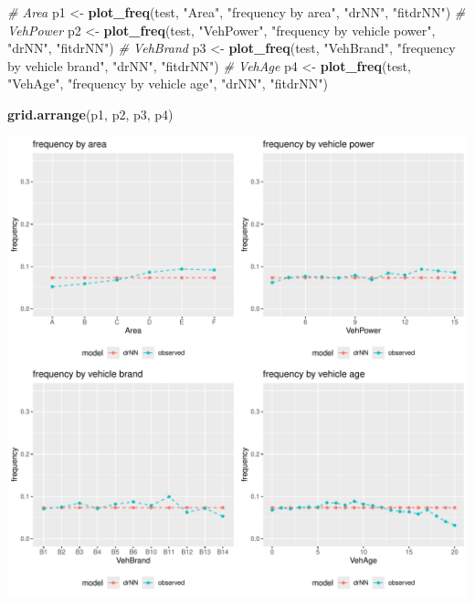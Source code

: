 \documentclass[
]{article}
\newenvironment{Shaded}{\begin{snugshade}}{\end{snugshade}}
\newcommand{\CommentTok}[1]{\textcolor[rgb]{0.56,0.35,0.01}{\textit{#1}}}
\newcommand{\FunctionTok}[1]{\textcolor[rgb]{0.13,0.29,0.53}{\textbf{#1}}}
\newcommand{\NormalTok}[1]{#1}
\newcommand{\OtherTok}[1]{\textcolor[rgb]{0.56,0.35,0.01}{#1}}
\newcommand{\StringTok}[1]{\textcolor[rgb]{0.31,0.60,0.02}{#1}}
\begin{document}
\begin{Shaded}
\begin{Highlighting}[]
\CommentTok{\# Area}
\NormalTok{p1 }\OtherTok{\textless{}{-}} \FunctionTok{plot\_freq}\NormalTok{(test, }\StringTok{"Area"}\NormalTok{, }\StringTok{"frequency by area"}\NormalTok{, }\StringTok{"drNN"}\NormalTok{, }\StringTok{"fitdrNN"}\NormalTok{)}
\CommentTok{\# VehPower}
\NormalTok{p2 }\OtherTok{\textless{}{-}} \FunctionTok{plot\_freq}\NormalTok{(test, }\StringTok{"VehPower"}\NormalTok{, }\StringTok{"frequency by vehicle power"}\NormalTok{, }\StringTok{"drNN"}\NormalTok{, }\StringTok{"fitdrNN"}\NormalTok{)}
\CommentTok{\# VehBrand}
\NormalTok{p3 }\OtherTok{\textless{}{-}} \FunctionTok{plot\_freq}\NormalTok{(test, }\StringTok{"VehBrand"}\NormalTok{, }\StringTok{"frequency by vehicle brand"}\NormalTok{, }\StringTok{"drNN"}\NormalTok{, }\StringTok{"fitdrNN"}\NormalTok{)}
\CommentTok{\# VehAge}
\NormalTok{p4 }\OtherTok{\textless{}{-}} \FunctionTok{plot\_freq}\NormalTok{(test, }\StringTok{"VehAge"}\NormalTok{, }\StringTok{"frequency by vehicle age"}\NormalTok{, }\StringTok{"drNN"}\NormalTok{, }\StringTok{"fitdrNN"}\NormalTok{)}

\FunctionTok{grid.arrange}\NormalTok{(p1, p2, p3, p4)}
\end{Highlighting}
\end{Shaded}

\includegraphics{freMTPLfreq_fnn-zh-cn_files/figure-latex/unnamed-chunk-68-1.pdf}
\end{document}
